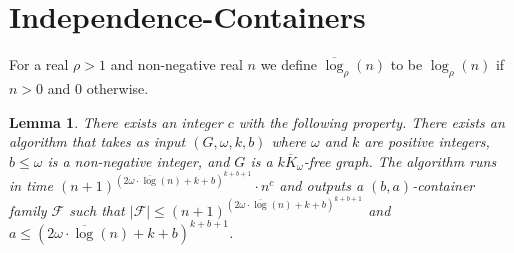 \documentclass[11pt]{amsart}
\newtheorem{lemma}[theorem]{Lemma}
\newcommand{\cal}{\mathcal}
\begin{document}
\section{Independence-Containers}\label{sec:containers}
%
For a real $\rho > 1$ and non-negative real $n$ we define $\overline{\log}_\rho(n)$ to be $\log_\rho(n)$ if $n > 0$ and $0$ otherwise.

\begin{lemma}\label{lem:containers1}
There exists an integer $c$ with the following property.
There exists an algorithm that takes as input $(G, \omega, k, b)$ where $\omega$ and $k$ are positive integers, $b \leq \omega$ is a non-negative integer, and $G$ is a $\overline{kK_\omega}$-free graph.
The algorithm runs in time $(n+1)^{  {(2\omega \cdot \overline{\log} (n) + k+ b)^{k+b+1}}} \cdot n^c$ and outputs a
$(b, a)$-container family ${\cal F}$ such that $|{\cal F}| \leq (n+1)^{  {(2\omega \cdot \overline{\log} (n) + k+b)^{k+b+1} }}$ and $a \leq  (2 \omega \cdot \overline{\log}(n) + k+b)^{k+b+1}$.
\end{lemma} 
\end{document}
